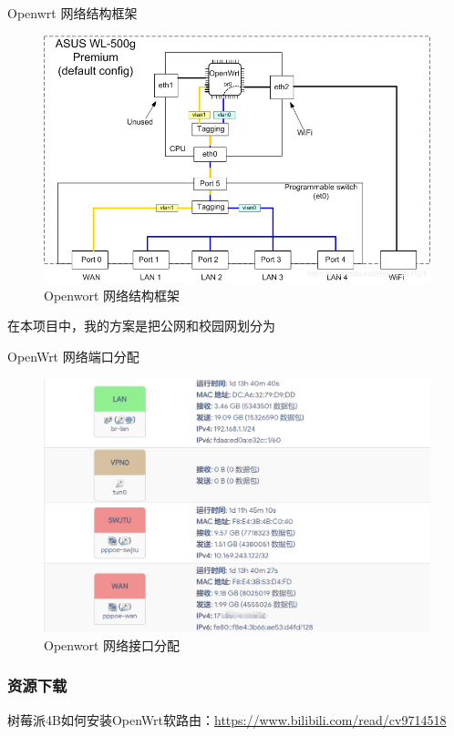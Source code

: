 \documentclass[cn,hazy,blue,10.5pt,normal]{elegantnote}
\begin{document}
Openwrt 网络结构框架

\begin{figure}[htbp]
  \centering
  \includegraphics[scale=0.45]{image/OpenWrt.png}
  \small
  \caption{Openwort 网络结构框架}\label{fig:1.1}
\end{figure}

在本项目中，我的方案是把公网和校园网划分为

\newpage

OpenWrt 网络端口分配

\begin{figure}[!htb]
  \centering
  \includegraphics[scale=0.25]{image/port.png}
  \caption{Openwort 网络接口分配}\label{fig:1.2}
\end{figure}

\subsubsection{资源下载}
树莓派4B如何安装OpenWrt软路由：\url{https://www.bilibili.com/read/cv9714518}
\end{document}
